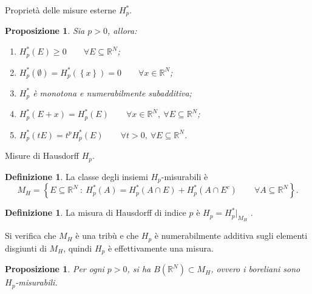 \documentclass[intlimits]{beamer}
\numberwithin{equation}{section}
\theoremstyle{plain}
\newtheorem{prop}[teor]{Proposizione}
\theoremstyle{definition}
\newtheorem{defin}[teor]{Definizione}
\theoremstyle{remark}
\newcommand{\gra}[1]{\left\{#1\right\}}
\renewcommand{\geq}{\geqslant}
\begin{document}
\begin{frame}{Proprietà delle misure esterne $H_p^*$.}
\begin{prop} Sia $p > 0$, allora: \pause
\begin{enumerate} 
\item  $H^{*}_p(E) \geq 0     \qquad \forall E\subseteq \mathbb{R}^N$; \pause
\item  $H^{*}_p(\emptyset) = H^{*}_p(\gra{x}) = 0  \qquad        \forall x\in \mathbb{R}^N$; \pause
\item $H^{*}_p$ è monotona e numerabilmente subadditiva;\pause
\item $H^{*}_p(E+x)=H^{*}_p(E)\qquad\forall x\in\mathbb{R}^N,\ \forall E \subseteq\mathbb{R}^N$;\pause
\item  $H^{*}_p(tE)= t^p H^{*}_p(E)\qquad\forall t>0,\ \forall E \subseteq\mathbb{R}^N$.
\end{enumerate}
\end{prop}  
\end{frame}


\begin{frame}{Misure di Hausdorff $H_p$.}
\begin{defin} La classe degli insiemi $H_p$-misurabili è 
\[M_H = \gra{E\subseteq \mathbb{R}^N\ :\ H^{*}_p(A) = H^{*}_p(A\cap E) + H^{*}_p(A\cap E^c)   
\qquad  \forall A\subseteq \mathbb{R}^N}.\] 
\end{defin}
\pause
\begin{defin} La misura di Hausdorff di indice $p$ è   $H_p =  H^{*}_p \vert_{M_H}$ .
\end{defin}
\pause
Si verifica che $M_H$ è una tribù e che $H_p$ è numerabilmente additiva sugli 
elementi disgiunti di $M_H$, quindi $H_p$ è effettivamente una misura.
\begin{prop} Per ogni $p > 0$,  si ha $B(\mathbb{R}^N) \subset M_H$,
ovvero i boreliani sono $H_p$-misurabili. \end{prop}
\end{frame}
\end{document}

